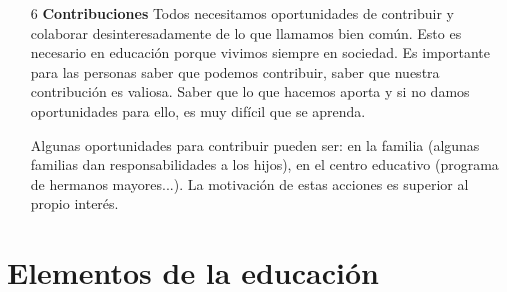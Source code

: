 \documentclass[palatino]{apuntesURJC}
\begin{document}
\begin{itemize}
	¿Qué permite al confianza? Afrontar nuevos retos, lo nuevo, lo que no se domina. Esto es un factor fundamental en la educación, ya que estamos continuamente abriendo horizontes nuevos.
	También permite enfrentar lo arriesgado. Para arriesgarse hace falta un nivel de confianza.
	Además, la confianza permite salir de la zona de confort y adquirir nuevas habilidades.

	Pero la autoconfianza también es positiva para los aspectos negativos de la vida: la autoconfianza soporta bien las dificultades que la vida presenta.
	Proporciona la , que ahora es baja.
	Esta frustración puede aparecer al recibir negativas por parte de otras personas, por fracasar en nuestros intentos... Ahora ocurre que ante el propio error se produce un bloqueo en lugar de un aprendizaje.

	\textbf{Conclusión} Es importante que el educador ofrezca confianza y permita los errores para ser corregidos y poder aprender. 
	\footnote{Sin perder de vista que el error es un medio para aprender. Nunca puede ser considerado como un fin}
	El error es una buena oportunidad para aprender y esto, es un problema porque se enfrenta contra el sobreproteccionismo (bienintencionado) que existe actualmente.
	La sobreprotección en educación es un error.
	Hay que ofrecer posibilidades para superarse, no hay que apartar las dificultades.

	\item[6] \textbf{Contribuciones}
	Todos necesitamos oportunidades de contribuir y colaborar desinteresadamente de lo que llamamos bien común. 
	Esto es necesario en educación porque vivimos siempre en sociedad. 
	Es importante para las personas saber que podemos contribuir, saber que nuestra contribución es valiosa. Saber que lo que hacemos aporta y si no damos oportunidades para ello, es muy difícil que se aprenda.

	Algunas oportunidades para contribuir pueden ser: en la familia (algunas familias dan responsabilidades a los hijos), en el centro educativo (programa de hermanos mayores...).
	La motivación de estas acciones es superior al propio interés.

\end{itemize}


\section{Elementos de la educación}
\end{document}
